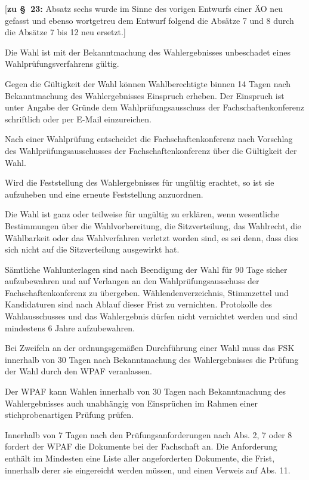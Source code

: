 \documentclass[%
draft,%
multilinesections%
]{fswo}
\newcommand\bemFr[1] {{\color{Red}[#1]}}
\newcommand\bemFr[1]{}%
\begin{document}
\bemFr{\textbf{zu \S~23:} Absatz sechs wurde im Sinne des vorigen Entwurfs einer ÄO neu gefasst und ebenso wortgetreu dem Entwurf folgend die Absätze 7 und 8 durch die Absätze 7 bis 12 neu ersetzt.}

\begin{contract}
Die Wahl ist mit der Bekanntmachung des Wahlergebnisses unbeschadet eines Wahlprüfungsverfahrens gültig.

Gegen die Gültigkeit der Wahl können Wahlberechtigte binnen 14 Tagen nach Bekanntmachung des Wahlergebnisses Einspruch erheben.
Der Einspruch ist unter Angabe der Gründe dem Wahlprüfungsausschuss der Fachschaftenkonferenz schriftlich oder per E-Mail einzureichen.

Nach einer Wahlprüfung entscheidet die Fachschaftenkonferenz nach Vorschlag des Wahlprüfungsausschusses der Fachschaftenkonferenz über die Gültigkeit der Wahl.

Wird die Feststellung des Wahlergebnisses für ungültig erachtet, so ist sie aufzuheben und eine erneute Feststellung anzuordnen.

Die Wahl ist ganz oder teilweise für ungültig zu erklären, wenn wesentliche Bestimmungen über die Wahlvorbereitung, die Sitzverteilung, das Wahlrecht, die Wählbarkeit oder das Wahlverfahren verletzt worden sind, es sei denn, dass dies sich nicht auf die Sitzverteilung ausgewirkt hat.

Sämtliche Wahlunterlagen sind nach Beendigung der Wahl für 90 Tage sicher aufzubewahren und auf Verlangen an den Wahlprüfungsausschuss der Fachschaftenkonferenz zu übergeben.
Wählendenverzeichnis, Stimmzettel und Kandidaturen sind nach Ablauf dieser Frist zu vernichten.
Protokolle des Wahlausschusses und das Wahlergebnis dürfen nicht vernichtet werden und sind mindestens 6 Jahre aufzubewahren.

Bei Zweifeln an der ordnungsgemäßen Durchführung einer Wahl muss das FSK innerhalb von 30 Tagen nach Bekanntmachung des Wahlergebnisses die Prüfung der Wahl durch den WPAF veranlassen.

Der WPAF kann Wahlen innerhalb von 30 Tagen nach Bekanntmachung des Wahlergebnisses auch unabhängig von Einsprüchen im Rahmen einer stichprobenartigen Prüfung prüfen.

Innerhalb von 7 Tagen nach den Prüfungsanforderungen nach Abs. 2, 7 oder 8 fordert der WPAF die Dokumente bei der Fachschaft an.
Die Anforderung enthält im Mindesten eine Liste aller angeforderten Dokumente, die Frist, innerhalb derer sie eingereicht werden müssen, und einen Verweis auf Abs. 11.


\end{contract}
\end{document}
